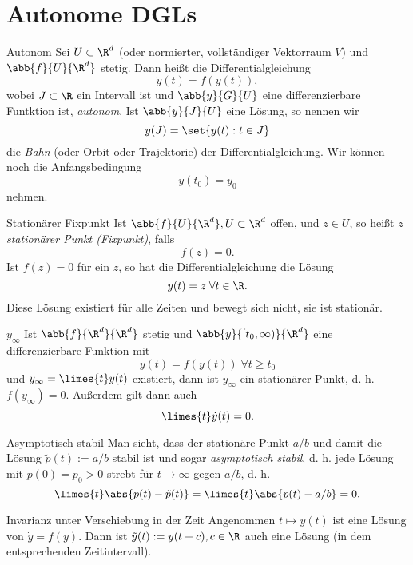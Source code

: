 \section{Autonome DGLs}

\begin{karte}{Autonom}
    Sei \(U \subset \R^d\) (oder normierter, vollständiger Vektorraum \(V\))
    und \(\abb{f}{U}{\R^d}\) stetig. Dann heißt die Differentialgleichung 
    \[ \dot{y}(t) = f(y(t)), \]
    wobei \(J\subset \R\) ein Intervall ist und \(\abb{y}{G}{U}\) eine 
    differenzierbare Funtktion ist, \textit{autonom}. 
    Ist \(\abb{y}{J}{U}\) eine Lösung, so nennen wir 
    \[ y(J) = \set{y(t) : t\in J} \]
    die \textit{Bahn} (oder Orbit oder Trajektorie) der Differentialgleichung. 
    Wir können noch die Anfangsbedingung 
    \[ y(t_0) = y_0 \] 
    nehmen.
\end{karte}

\begin{karte}{Stationärer Fixpunkt}
    Ist \(\abb{f}{U}{\R^d}, U \subset \R^d \) offen, und \(z\in U\), 
    so heißt \(z\) \textit{stationärer Punkt (Fixpunkt)}, 
    falls 
    \[ f(z) = 0. \]
    Ist \(f(z) = 0\) für ein \(z\), so hat die Differentialgleichung die 
    Lösung 
    \[ y(t) = z \;\forall t\in \R. \]
    Diese Lösung existiert für alle Zeiten und bewegt sich nicht, sie ist stationär.
\end{karte}

\begin{karte}{\(y_\infty\)}
    Ist \(\abb{f}{\R^d}{\R^d}\) stetig und \(\abb{y}{[t_0,\infty)}{\R^d}\) 
    eine differenzierbare Funktion mit 
    \[ \dot{y}(t) = f(y(t)) \;\forall t\geq t_0 \]
    und \(y_\infty = \limes{t} y(t)\) existiert, dann ist \(y_\infty\) 
    ein stationärer Punkt, d. h. \(f(y_\infty) = 0\). Außerdem gilt dann auch 
    \[ \limes{t} \dot{y}(t) = 0. \]
\end{karte}

\begin{karte}{Asymptotisch stabil}
    Man sieht, dass der stationäre Punkt \(a/b\) und damit die Lösung 
    \(\tilde{p}(t) := a/b\) stabil ist und sogar \textit{asymptotisch stabil}, 
    d. h. jede Lösung mit \(p(0) = p_0 > 0\) strebt für 
    \(t\rightarrow \infty\) gegen \(a/b\), d. h. 
    \[ \limes{t} \abs{p(t) - \tilde{p}(t)} = \limes{t} \abs{p(t) - a/b} = 0. \]
\end{karte}

\begin{karte}{Invarianz unter Verschiebung in der Zeit}
    Angenommen \(t\mapsto y(t) \) ist eine Lösung von \(\dot{y} = f(y)\). 
    Dann ist \(\tilde{y}(t) := y(t+c), c\in \R\) auch eine Lösung 
    (in dem entsprechenden Zeitintervall).
\end{karte}

